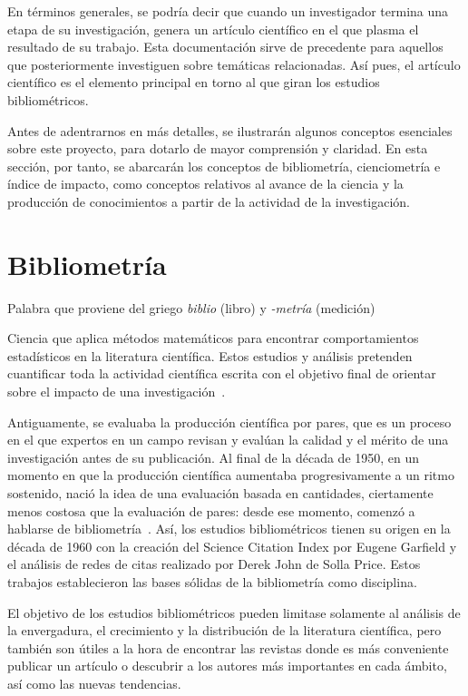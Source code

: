 
En términos generales, se podría decir que cuando un investigador termina una etapa de su investigación, genera un artículo científico en el que plasma el resultado de su trabajo. Esta documentación sirve de precedente para aquellos que posteriormente investiguen sobre temáticas relacionadas. Así pues, el artículo científico es el elemento principal en torno al que giran los estudios bibliométricos.

Antes de adentrarnos en más detalles, se ilustrarán algunos conceptos esenciales sobre este proyecto, para dotarlo de mayor comprensión y claridad. En esta sección, por tanto, se abarcarán los conceptos de bibliometría, cienciometría e índice de impacto, como conceptos relativos al avance de la ciencia y la producción de conocimientos a partir de la actividad de la investigación.


\section{Bibliometría}

Palabra que proviene del griego \textit{biblio} (libro) y \textit{-metría} (medición)

Ciencia que aplica métodos matemáticos para encontrar comportamientos estadísticos en la literatura científica. Estos estudios y análisis pretenden cuantificar toda la actividad científica escrita con el objetivo final de orientar sobre el impacto de una investigación~\cite{Amat1989}.

Antiguamente, se evaluaba la producción científica por pares, que es un proceso en el que expertos en un campo revisan y evalúan la calidad y el mérito de una investigación antes de su publicación. 
Al final de la década de 1950, en un momento en que la producción científica aumentaba progresivamente a un ritmo sostenido, nació la idea de una evaluación basada en cantidades, ciertamente menos costosa que la evaluación de pares: desde ese momento, comenzó a hablarse de bibliometría~\cite{Turbanti2017}.
Así, los estudios bibliométricos tienen su origen en la década de 1960 con la creación del Science Citation Index por Eugene Garfield y el análisis de redes de citas realizado por Derek John de Solla Price. Estos trabajos establecieron las bases sólidas de la bibliometría como disciplina.

El objetivo de los estudios bibliométricos pueden limitase solamente al análisis de la envergadura, el crecimiento y la distribución de la literatura científica, pero también son útiles a la hora de encontrar las revistas donde es más conveniente publicar un artículo o descubrir a los autores más importantes en cada ámbito, así como las nuevas tendencias.

